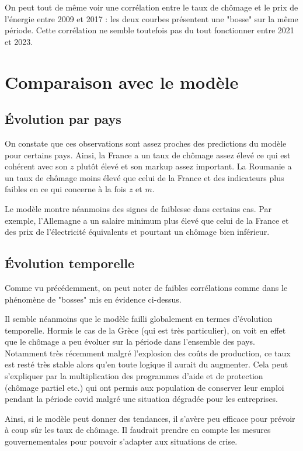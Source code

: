 \documentclass{article}
\begin{document}
On peut tout de même voir une corrélation entre le taux de chômage et le prix de l'énergie entre 2009 et 2017 : les deux courbes présentent une "bosse" sur la même période. Cette corrélation ne semble toutefois pas du tout fonctionner entre 2021 et 2023.

\section{Comparaison avec le modèle}

\subsection{Évolution par pays}
On constate que ces observations sont assez proches des predictions du modèle pour certains pays. Ainsi, la France a un taux de chômage assez élevé ce qui est cohérent avec son $z$ plutôt élevé et son markup assez important. La Roumanie a un taux de chômage moins élevé que celui de la France et des indicateurs plus faibles en ce qui concerne à la fois $z$ et $m$.

Le modèle montre néanmoins des signes de faiblesse dans certains cas. Par exemple, l'Allemagne a un salaire minimum plus élevé que celui de la France et des prix de l'électricité équivalents et pourtant un chômage bien inférieur.

\subsection{Évolution temporelle}

Comme vu précédemment, on peut noter de faibles corrélations comme dans le phénomène de "bosses" mis en évidence ci-dessus.
\vspace{0.5cm}

Il semble néanmoins que le modèle failli globalement en termes d'évolution temporelle. Hormis le cas de la Grèce (qui est très particulier), on voit en effet que le chômage a peu évoluer sur la période dans l'ensemble des pays. Notamment très récemment malgré l'explosion des coûts de production, ce taux est resté très stable alors qu'en toute logique il aurait du augmenter. Cela peut s'expliquer par la multiplication des programmes d'aide et de protection (chômage partiel etc.) qui ont permis aux population de conserver leur emploi pendant la période covid malgré une situation dégradée pour les entreprises. 
\vspace{0.5cm}

Ainsi, si le modèle peut donner des tendances, il s'avère peu efficace pour prévoir à coup sûr les taux de chômage. Il faudrait prendre en compte les mesures gouvernementales pour pouvoir s'adapter aux situations de crise.
\end{document}

